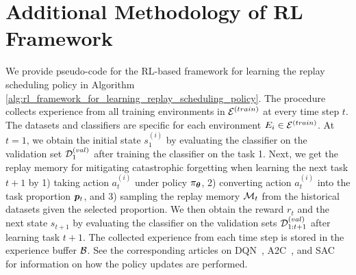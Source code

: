 


\section{Additional Methodology of RL Framework}\label{paperD:app:methodology}

We provide pseudo-code for the RL-based framework for learning the replay scheduling policy 
in Algorithm \ref{alg:rl_framework_for_learning_replay_scheduling_policy}. 
The procedure collects experience from all training environments in ${\mathcal{E}}^{(train)}$ at every time step $t$. The datasets and classifiers are specific for each environment $E_i \in {\mathcal{E}}^{(train)}$. At $t=1$, we obtain the initial state $s_1^{(i)}$ by evaluating the classifier on the validation set ${\mathcal{D}}_1^{(val)}$ after training the classifier on the task 1. Next, we get the replay memory for mitigating catastrophic forgetting when learning the next task $t+1$ by 1) taking action $a_t^{(i)}$ under policy $\pi_{{\bm{\theta}}}$, 2) converting action $a_t^{(i)}$ into the task proportion ${\bm{p}}_{t}$, and 3) sampling the replay memory ${\mathcal{M}}_t$ from the historical datasets given the selected proportion. We then obtain the reward $r_t$ and the next state $s_{t+1}$ by evaluating the classifier on the validation sets ${\mathcal{D}}_{1:t+1}^{(val)}$ after learning task $t+1$. The collected experience from each time step is stored in the experience buffer ${\mathcal{B}}$. %
See the corresponding articles on DQN~, A2C~, and SAC~ for information on how the policy updates are performed. 


